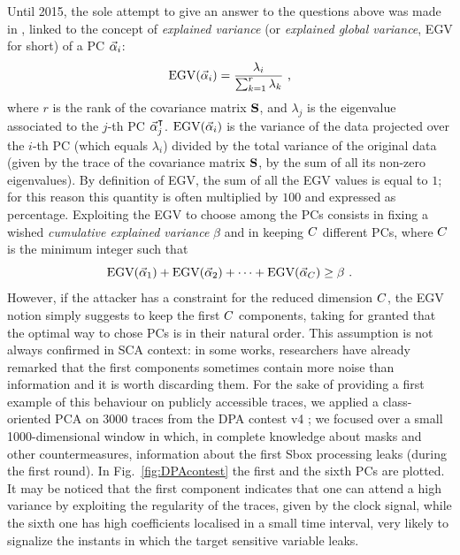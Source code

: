 Until 2015, the sole attempt to give an answer to the questions above was made in \cite{choudary2014efficient}, linked to the concept of {\em explained variance} (or {\em explained global variance}, EGV for short) of a PC $\vec{\alpha}_i$:
\begin{equation}\label{eq:EGV}
\mathrm{EGV}(\vec{\alpha}_i) =  \frac{\lambda_i}{\sum_{k=1}^r\lambda_k} \mbox{ ,}
\end{equation}
where $r$ is the rank of the covariance matrix $\textbf{S}$, and $\lambda_j$ is the eigenvalue associated to the $j$-th PC $\vec{\alpha}_j^\intercal$. $\mathrm{EGV}(\vec{\alpha}_i)$ is the variance of the data projected over the $i$-th PC (which equals $\lambda_i$) divided by the total variance of the original data (given by the trace of the covariance matrix $\textbf{S}$, \ie by the sum of all its non-zero eigenvalues). By definition of EGV, the sum of all the EGV values is equal to $1$; for this reason this quantity is often multiplied by $100$ and expressed as percentage.
Exploiting the EGV to choose among the PCs consists in fixing a wished {\em cumulative explained variance} $\beta$ and in keeping $C$ different PCs, where $C$ is the minimum integer such that
\begin{equation}
\mbox{EGV}(\vec{\alpha}_1) +\mbox{EGV}(\vec{\alpha}_2) + \dots +\mbox{EGV}(\vec{\alpha}_C) \geq \beta \mbox{ .}
\end{equation}
However, if the attacker has a constraint for the reduced dimension $C$, the EGV notion simply suggests to keep the first $C$ components, taking for granted that the optimal way to chose PCs is in their natural order. This assumption is not always confirmed in SCA context: in some works, researchers have already remarked that the first components sometimes contain more noise than information \cite{Batina2012,specht} and it is worth discarding them. For the sake of providing a first example of this behaviour on publicly accessible traces, we applied a class-oriented PCA on 3000 traces from the DPA contest v4 \cite{DPAcontest}; we focused over a small 1000-dimensional window in which, in complete knowledge about masks and other countermeasures, information about the first Sbox processing leaks (during the first round). In Fig.~\ref{fig:DPAcontest} the first and the sixth PCs are plotted. It may be noticed that the first component indicates that one can attend a high variance by exploiting the regularity of the traces, given by the clock signal, while the sixth one has high coefficients localised in a small time interval, very likely to signalize the instants in which the target sensitive variable leaks.

